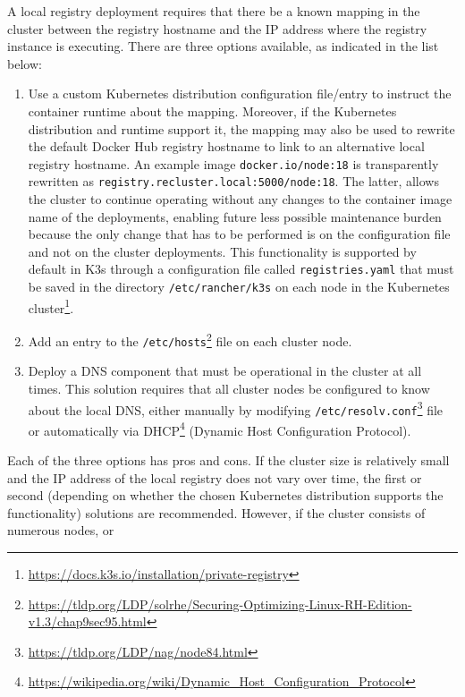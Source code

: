 A local registry deployment requires that there be a known mapping in the cluster
between the registry hostname and the IP address where the registry instance is executing.
There are three options available, as indicated in the list below:
\begin{enumerate}
  \item Use a custom Kubernetes distribution configuration file/entry to instruct
    the container runtime about the mapping. Moreover, if the Kubernetes distribution
    and runtime support it, the mapping may also be used to rewrite the default
    Docker Hub registry hostname to link to an alternative local registry
    hostname. An example image \texttt{docker.io/node:18} is transparently
    rewritten as \texttt{registry.recluster.local:5000/node:18}. The latter, allows
    the cluster to continue operating without any changes to the container image
    name of the deployments, enabling future less possible maintenance burden
    because the only change that has to be performed is on the configuration
    file and not on the cluster deployments.
    \newline
    This functionality is supported by default in K3s through a configuration file
    called \texttt{registries.yaml} that must be saved in the directory \texttt{/etc/rancher/k3s}
    on each node in the Kubernetes cluster\footnote{\url{https://docs.k3s.io/installation/private-registry}}.

  \item Add an entry to the \texttt{/etc/hosts}\footnote{\url{https://tldp.org/LDP/solrhe/Securing-Optimizing-Linux-RH-Edition-v1.3/chap9sec95.html}}
    file on each cluster node.

  \item Deploy a DNS component that must be operational in the cluster at all times.
    \newline
    This solution requires that all cluster nodes be configured to know about
    the local DNS, either manually by modifying \texttt{/etc/resolv.conf}\footnote{\url{https://tldp.org/LDP/nag/node84.html}}
    file or automatically via DHCP\footnote{\url{https://wikipedia.org/wiki/Dynamic_Host_Configuration_Protocol}}
    (Dynamic Host Configuration Protocol).
\end{enumerate}
Each of the three options has pros and cons. If the cluster size is relatively small
and the IP address of the local registry does not vary over time, the first or
second (depending on whether the chosen Kubernetes distribution supports the functionality)
solutions are recommended. However, if the cluster consists of numerous nodes, or
